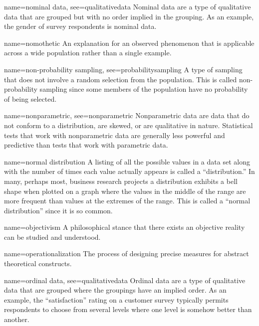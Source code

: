 {name={nominal data},
	see={qualitativedata}}
{%
	Nominal data are a type of qualitative data that are grouped but with no order implied in the grouping. As an example, the gender of survey respondents is nominal data.
}

{name={nomothetic}}
{%
	An explanation for an observed phenomenon that is applicable across a wide population rather than a single example.
}

{name={non-probability sampling},
	see={probabilitysampling}}
{%
	A type of sampling that does not involve a random selection from the population. This is called non-probability sampling since some members of the population have no probability of being selected.
}

{name={nonparametric},
	see={nonparametric}}
{%
	Nonparametric data are data that do not conform to a distribution, are skewed, or are qualitative in nature. Statistical tests that work with nonparametric data are generally less powerful and predictive than tests that work with parametric data.
}

{name={normal distribution}}
{%
	A listing of all the possible values in a data set along with the number of times each value actually appears is called a ``distribution.'' In many, perhaps most, business research projects a distribution exhibits a bell shape when plotted on a graph where the values in the middle of the range are more frequent than values at the extremes of the range. This is called a ``normal distribution'' since it is so common.
}

{name={objectivism}}
{%
	A philosophical stance that there exists an objective reality can be studied and understood.
}


{name={operationalization}}
{%
	 The process of designing precise measures for abstract theoretical constructs. 
}

{name={ordinal data},
	see={qualitativedata}}
{%
	Ordinal data are a type of qualitative data that are grouped where the groupings have an implied order. As an example, the ``satisfaction'' rating on a customer survey typically permits respondents to choose from several levels where one level is somehow better than another.
}

